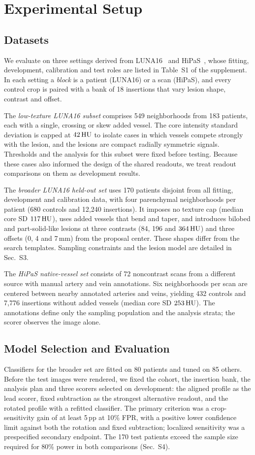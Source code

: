 \section{Experimental Setup}
\label{sec:protocol}
\subsection{Datasets}
We evaluate on three settings derived from LUNA16~\cite{setio2017,armato2011} and HiPaS~\cite{chu2025hipas}, whose fitting, development, calibration and test roles are listed in Table~S1 of the supplement. In each setting a \emph{block} is a patient (LUNA16) or a scan (HiPaS), and every control crop is paired with a bank of 18 insertions that vary lesion shape, contrast and offset.

The \emph{low-texture LUNA16 subset} comprises 549 neighborhoods from 183 patients, each with a single, crossing or skew added vessel. The core intensity standard deviation is capped at $42\,\mathrm{HU}$ to isolate cases in which vessels compete strongly with the lesion, and the lesions are compact radially symmetric signals. Thresholds and the analysis for this subset were fixed before testing. Because these cases also informed the design of the shared readouts, we treat readout comparisons on them as development results.

The \emph{broader LUNA16 held-out set} uses 170 patients disjoint from all fitting, development and calibration data, with four parenchymal neighborhoods per patient (680 controls and 12,240 insertions). It imposes no texture cap (median core SD $117\,\mathrm{HU}$), uses added vessels that bend and taper, and introduces bilobed and part-solid-like lesions at three contrasts (84, 196 and $364\,\mathrm{HU}$) and three offsets (0, 4 and 7\,mm) from the proposal center. These shapes differ from the search templates. Sampling constraints and the lesion model are detailed in Sec.~S3.

The \emph{HiPaS native-vessel set} consists of 72 noncontrast scans from a different source with manual artery and vein annotations. Six neighborhoods per scan are centered between nearby annotated arteries and veins, yielding 432 controls and 7,776 insertions without added vessels (median core SD $253\,\mathrm{HU}$). The annotations define only the sampling population and the analysis strata; the scorer observes the image alone.


\subsection{Model Selection and Evaluation}
Classifiers for the broader set are fitted on 80 patients and tuned on 85 others. Before the test images were rendered, we fixed the cohort, the insertion bank, the analysis plan and three scorers selected on development: the aligned profile as the lead scorer, fixed subtraction as the strongest alternative readout, and the rotated profile with a refitted classifier. The primary criterion was a crop-sensitivity gain of at least 5\,pp at 10\% FPR, with a positive lower confidence limit against both the rotation and fixed subtraction; localized sensitivity was a prespecified secondary endpoint. The 170 test patients exceed the sample size required for 80\% power in both comparisons (Sec.~S4).

